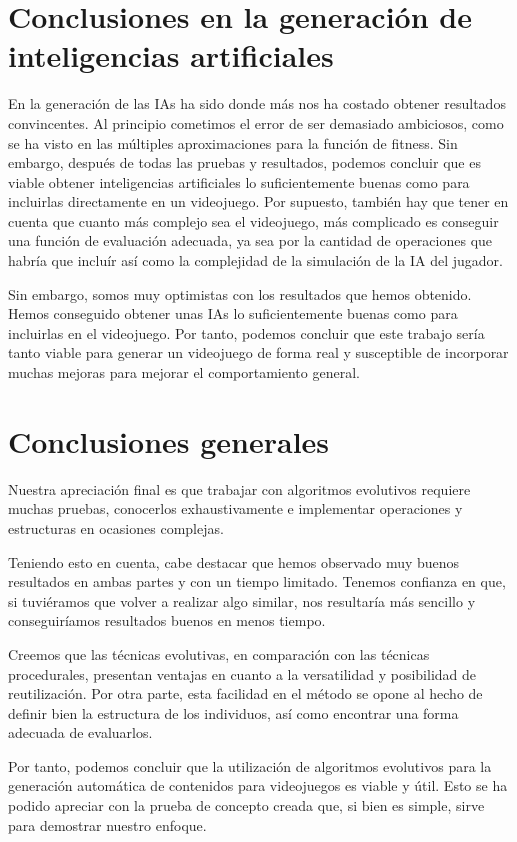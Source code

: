 \section{Conclusiones en la generaci\'on de inteligencias artificiales}
En la generaci\'on de las IAs ha sido donde m\'as nos ha costado obtener resultados convincentes. Al principio cometimos el error de ser demasiado ambiciosos, como se ha visto en las m\'ultiples aproximaciones para la funci\'on de fitness. Sin embargo, despu\'es de todas las pruebas y resultados, podemos concluir que es viable obtener inteligencias artificiales lo suficientemente buenas como para incluirlas directamente en un videojuego. Por supuesto, tambi\'en hay que tener en cuenta que cuanto m\'as complejo sea el videojuego, m\'as complicado es conseguir una funci\'on de evaluaci\'on adecuada, ya sea por la cantidad de operaciones que habr\'ia que inclu\'ir as\'i como la complejidad de la simulaci\'on de la IA del jugador.\par
Sin embargo, somos muy optimistas con los resultados que hemos obtenido. Hemos conseguido obtener unas IAs lo suficientemente buenas como para incluirlas en el videojuego. Por tanto, podemos concluir que este trabajo ser\'ia tanto viable para generar un videojuego de forma real y susceptible de incorporar muchas mejoras para mejorar el comportamiento general.\par
\section{Conclusiones generales}
Nuestra apreciaci\'on final es que trabajar con algoritmos evolutivos requiere muchas pruebas, conocerlos exhaustivamente e implementar operaciones y estructuras en ocasiones complejas.\par
Teniendo esto en cuenta, cabe destacar que hemos observado muy buenos resultados en ambas partes y con un tiempo limitado. Tenemos confianza en que, si tuvi\'eramos que volver a realizar algo similar, nos resultar\'ia m\'as sencillo y conseguir\'iamos resultados buenos en menos tiempo.\par
Creemos que las t\'ecnicas evolutivas, en comparaci\'on con las t\'ecnicas procedurales, presentan ventajas en cuanto a la versatilidad y posibilidad de reutilizaci\'on. Por otra parte, esta facilidad en el m\'etodo se opone al hecho de definir bien la estructura de los individuos, as\'i como encontrar una forma adecuada de evaluarlos.\par
Por tanto, podemos concluir que la utilizaci\'on de algoritmos evolutivos para la generaci\'on autom\'atica de contenidos para videojuegos es viable y \'util. Esto se ha podido apreciar con la prueba de concepto creada que, si bien es simple, sirve para demostrar nuestro enfoque.\par

